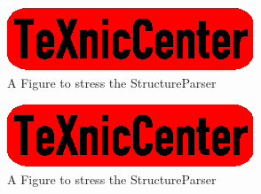 \begin{figure}
	\begin{center}
		\includegraphics{txc.eps}
	\end{center}
	\caption{A Figure to stress the StructureParser}
\end{figure}

\begin{figure}
	\begin{center}
		\includegraphics{txc.eps}
	\end{center}
	\caption{A Figure to stress the StructureParser}
\end{figure}


\clearpage


